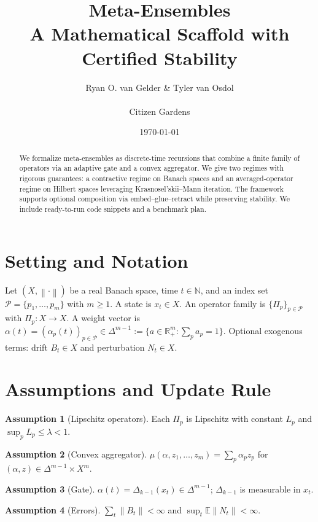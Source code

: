 \documentclass[11pt]{article}
\title{Meta-Ensembles \\ A Mathematical Scaffold with Certified Stability}
\author{Ryan O. van Gelder \& Tyler van Osdol  \\ \\ Citizen Gardens}
\date{\today}
\theoremstyle{definition}
\newtheorem{assumption}{Assumption}
\newcommand{\R}{\mathbb{R}}
\newcommand{\N}{\mathbb{N}}
\newcommand{\E}{\mathbb{E}}
\newcommand{\norm}[1]{\left\lVert #1\right\rVert}
\newcommand{\simplex}{\Delta}
\newcommand{\gate}{\Delta}
\begin{document}
\maketitle

\begin{abstract}
We formalize meta-ensembles as discrete-time recursions that combine a finite family of operators via an adaptive gate and a convex aggregator. We give two regimes with rigorous guarantees: a contractive regime on Banach spaces and an averaged-operator regime on Hilbert spaces leveraging Krasnosel'skii--Mann iteration. The framework supports optional composition via embed--glue--retract while preserving stability. We include ready-to-run code snippets and a benchmark plan.
\end{abstract}

\section{Setting and Notation}
Let $(X,\norm{\cdot})$ be a real Banach space, time $t\in\N$, and an index set $\mathcal P=\{p_1,\dots,p_m\}$ with $m\ge1$. A state is $x_t\in X$. An operator family is $\{\Pi_p\}_{p\in\mathcal P}$ with $\Pi_p:X\to X$. A weight vector is $\alpha(t)=(\alpha_p(t))_{p\in\mathcal P}\in\simplex^{m-1}:=\{a\in\R_+^m: \sum_p a_p=1\}$. Optional exogenous terms: drift $B_t\in X$ and perturbation $N_t\in X$.

\section{Assumptions and Update Rule}
\begin{assumption}[Lipschitz operators]\label{ass:lipschitz}
Each $\Pi_p$ is Lipschitz with constant $L_p$ and $\sup_{p}L_p\le\lambda<1$.
\end{assumption}
\begin{assumption}[Convex aggregator]\label{ass:mu}
$\mu(\alpha,z_1,\dots,z_m)=\sum_{p}\alpha_p z_p$ for $(\alpha,z)\in \simplex^{m-1}\times X^m$.
\end{assumption}
\begin{assumption}[Gate]\label{ass:gate}
$\alpha(t)=\gate_{k-1}(x_t)\in \simplex^{m-1}$; $\gate_{k-1}$ is measurable in $x_t$.
\end{assumption}
\begin{assumption}[Errors]\label{ass:errors}
$\sum_t\norm{B_t}<\infty$ and $\sup_t\E\norm{N_t}<\infty$.
\end{assumption}
\end{document}
